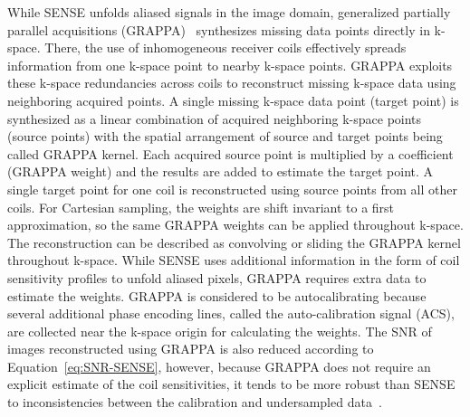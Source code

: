 While SENSE unfolds aliased signals in the image domain, generalized partially parallel acquisitions (GRAPPA)~\cite{GRAPPA} synthesizes missing data points directly in k-space. 
There, the use of inhomogeneous receiver coils effectively spreads information from one k-space point to nearby k-space points. GRAPPA exploits these k-space redundancies across coils to reconstruct missing k-space data using neighboring acquired points. A single missing k-space data point (target point) is synthesized as a linear combination of acquired neighboring k-space points (source points) with the spatial arrangement of source and target points being called GRAPPA kernel. Each acquired source point is multiplied by a coefficient (GRAPPA weight) and the results are added to estimate the target point. A single target point for one coil is reconstructed using source points from all other coils. For Cartesian sampling, the weights are shift invariant to a first approximation, so the same GRAPPA weights can be applied throughout k-space. The reconstruction can be described as convolving or sliding the GRAPPA kernel throughout k-space.
While SENSE uses additional information in the form of coil sensitivity profiles to unfold aliased pixels, GRAPPA requires extra data to estimate the weights. GRAPPA is considered to be autocalibrating because several additional phase encoding lines, called the auto-calibration signal (ACS), are collected near the k-space origin for calculating the weights. 
The SNR of images reconstructed using GRAPPA is also reduced according to Equation~\ref{eq:SNR-SENSE}, however, because GRAPPA does not require an explicit estimate of the coil sensitivities, it tends to be more robust than SENSE to inconsistencies between the calibration and undersampled data~\cite{AdvancesPI}.\\
